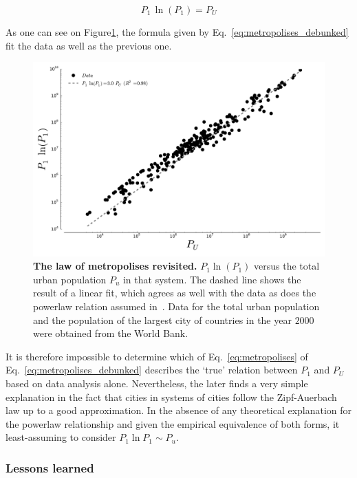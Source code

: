 \begin{equation}
    \boxed{P_1\,\ln(P_1) = P_U}
    \label{eq:metropolises_debunked}
\end{equation}

As one can see on Figure\ref{fig:metropolises_debunked}, the formula given by
Eq.~\ref{eq:metropolises_debunked} fit the data as well as the previous one.

\begin{figure}
    \centering
    \includegraphics[width=\textwidth]{gfx/chapter-intro/law_metropolises_debunked.pdf}
    \caption{{\bf The law of metropolises revisited.} $P_1 \ln(P_1)$ versus the total urban population $P_u$ in that
system. The dashed line shows the result of a linear fit, which agrees as well
with the data as does the powerlaw relation assumed in~\cite{Pumain:1997}. Data for the total urban
population and the population of the largest city of countries in the year
$2000$ were obtained from
the World Bank.\label{fig:metropolises_debunked}}
\end{figure}


It is therefore impossible to determine which of
Eq.~\ref{eq:metropolises} of Eq.~\ref{eq:metropolises_debunked} describes the
`true' relation between $P_1$ and $P_U$ based on data analysis alone.
Nevertheless, the later finds a very simple explanation in the fact that cities
in systems of cities follow the Zipf-Auerbach law up to a good
approximation. In the absence of any theoretical explanation for the powerlaw
relationship and given the empirical equivalence of both forms, it
least-assuming to consider $P_1 \ln P_1 \sim P_u$.


\subsubsection{Lessons learned}
\label{sub:lessons_learned}

